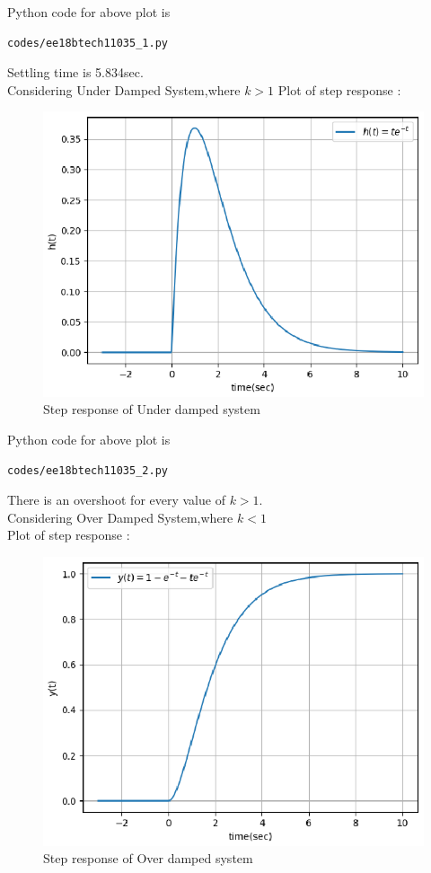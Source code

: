 \begin{enumerate}[label=\thesubsection.\arabic*.,ref=\thesubsection.\theenumi]
Python code for above plot is
\begin{lstlisting}
codes/ee18btech11035_1.py
\end{lstlisting}

Settling time is 5.834sec.\\
Considering Under Damped System,where $k>1$
Plot of step response :
\begin{figure}[!h]
  \includegraphics[width=\columnwidth]{./figures/ee18btech11035_2.eps}
  \caption{Step response of Under damped system}
  \label{fig:ee18btech11035_2}
\end{figure}

Python code for above plot is
\begin{lstlisting}
codes/ee18btech11035_2.py
\end{lstlisting}

There is an overshoot for every value of $k>1$.\\
Considering Over Damped System,where $k<1$\\
Plot of step response :
\begin{figure}[!h]
  \includegraphics[width=\columnwidth]{./figures/ee18btech11035_3.eps}
  \caption{Step response of Over damped system}
  \label{fig:ee18btech11035_3}
\end{figure}


\end{enumerate}
